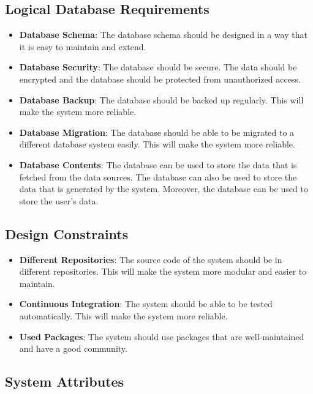\documentclass[a4paper]{article}
\begin{document}
        \subsection{Logical Database Requirements}

            \begin{itemize}
                \item \textbf{Database Schema}: The database schema should be designed in a way that it is easy to maintain and extend.
                \item \textbf{Database Security}: The database should be secure. The data should be encrypted and the database should be protected from unauthorized access.
                \item \textbf{Database Backup}: The database should be backed up regularly. This will make the system more reliable.
                \item \textbf{Database Migration}: The database should be able to be migrated to a different database system easily. This will make the system more reliable.
                \item \textbf{Database Contents}: The database can be used to store the data that is fetched from the data sources. The database can also be used to store the data that is generated by the system.
                Moreover, the database can be used to store the user's data.
            \end{itemize}

        \subsection{Design Constraints}

        \begin{itemize}
            \item \textbf{Different Repositories}: The source code of the system should be in different repositories. This will make the system more modular and easier to maintain.
            \item \textbf{Continuous Integration}: The system should be able to be tested automatically. This will make the system more reliable.
            \item \textbf{Used Packages}: The system should use packages that are well-maintained and have a good community.
        \end{itemize}

        \subsection{System Attributes}
\end{document}
